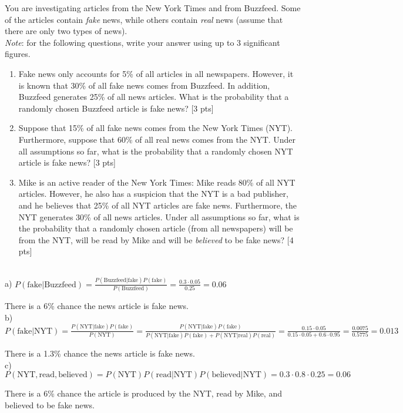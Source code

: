 You are investigating articles from the New York Times and from Buzzfeed.
Some of the articles contain \emph{fake} news, while others contain \emph{real} news (assume that there are only two types of news). \\
 \emph{Note}: for the following questions, write your answer using up to 3 significant figures.
 
 \begin{enumerate}
     \item Fake news only accounts for 5\% of all articles in all newspapers.
     However, it is known that 30\% of all fake news comes from Buzzfeed.
     In addition, Buzzfeed generates 25\% of all news articles.
     What is the probability that a randomly chosen Buzzfeed article is fake news? 
     [3 pts]
     \item Suppose that 15\% of all fake news comes from the New York Times (NYT).
     Furthermore, suppose that 60\% of all real news comes from the NYT. 
     Under all assumptions so far, what is the probability that a randomly chosen NYT article is fake news? 
     [3 pts]
     \item Mike is an active reader of the New York Times: Mike reads 80\% of all NYT articles.
    However, he also has a suspicion that the NYT is a bad publisher, and he believes that 25\% of all NYT articles are fake news.
    Furthermore, the NYT generates 30\% of all news articles.
    Under all assumptions so far, what is the probability that a randomly chosen article (from all newspapers) will be from the NYT, will be read by Mike and will be \emph{believed} to be fake news?
    [4 pts]
     
     
 \end{enumerate}
 
 \begin{solution} \ \\
a) $P(\text{fake} | \text{Buzzfeed}) = \frac{P(\text{Buzzfeed} | \text{fake})P(\text{fake})}{P(\text{Buzzfeed})} = \frac{0.3\cdot 0.05}{0.25} = 0.06$

There is a 6\% chance the news article is fake news.\\

b) $P(\text{fake} | \text{NYT}) = \frac{P(\text{NYT} | \text{fake})P(\text{fake})}{P(\text{NYT})} = \frac{P(\text{NYT} | \text{fake})P(\text{fake})}{P(\text{NYT} | \text{fake})P(\text{fake}) + P(\text{NYT} | \text{real})P(\text{real})} = \frac{0.15 \cdot 0.05}{0.15\cdot 0.05 + 0.6\cdot 0.95} = \frac{0.0075}{0.5775} = 0.013$

There is a 1.3\% chance the news article is fake news.\\

c) $P(\text{NYT}, \text{read}, \text{believed}) = P(\text{NYT})P(\text{read} | \text{NYT})P(\text{believed} | \text{NYT}) = 0.3\cdot 0.8\cdot 0.25 = 0.06$

There is a 6\% chance the article is produced by the NYT, read by Mike, and believed to be fake news.
\end{solution}